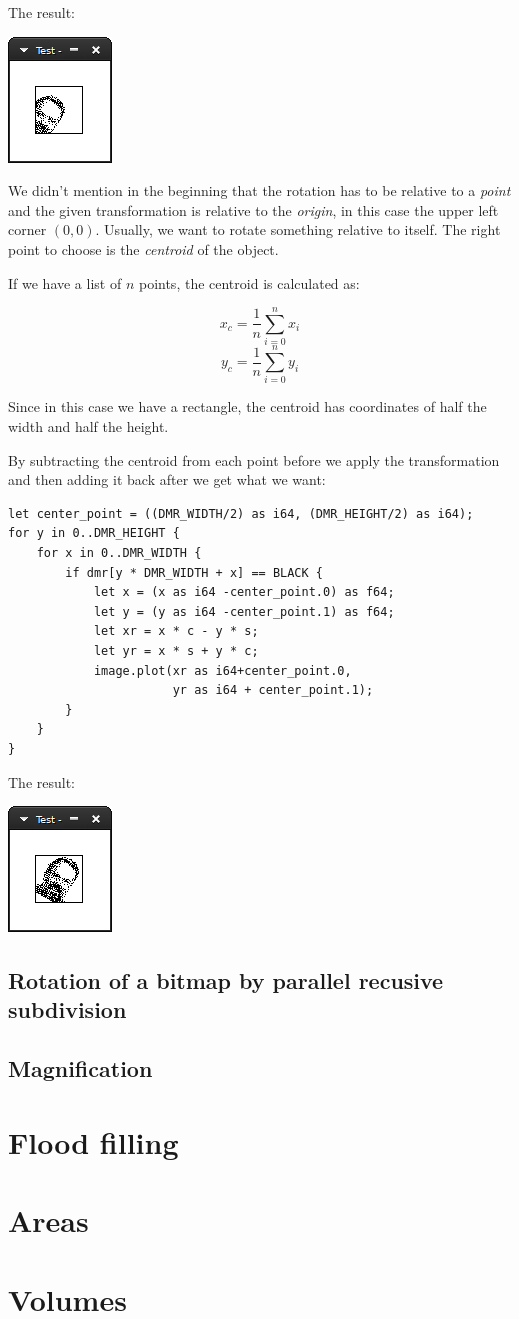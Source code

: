 \documentclass[12pt,a4,oneside,usenames,dvipsnames]{book}
\newcommand\bitmap{{\pixel{}bitmap}}
\begin{document}
The result:

\includegraphics{figures/ch11-2.png}

We didn't mention in the beginning that the rotation has to be relative to a \emph{point} and the given transformation is relative to the \emph{origin}, in this case the upper left corner $(0,0)$. Usually, we want to rotate something relative to itself. The right point to choose is the \emph{centroid} of the object.

If we have a list of $n$ points, the centroid is calculated as:

$$ x_c = \frac{1}{n}\sum_{i=0}^{n} x_i $$
$$ y_c = \frac{1}{n}\sum_{i=0}^{n} y_i $$

Since in this case we have a rectangle, the centroid has coordinates of half the width and half the height.

By subtracting the centroid from each point before we apply the transformation and then adding it back after we get what we want:

\begin{verbatim}
let center_point = ((DMR_WIDTH/2) as i64, (DMR_HEIGHT/2) as i64);
for y in 0..DMR_HEIGHT {
    for x in 0..DMR_WIDTH {
        if dmr[y * DMR_WIDTH + x] == BLACK {
            let x = (x as i64 -center_point.0) as f64;
            let y = (y as i64 -center_point.1) as f64;
            let xr = x * c - y * s;
            let yr = x * s + y * c;
            image.plot(xr as i64+center_point.0,
                       yr as i64 + center_point.1);
        }
    }
}
\end{verbatim}

The result:

\includegraphics{figures/ch11-3.png}

\chapter{Rotation of a \bitmap{} by parallel recusive subdivision}
\chapter{Magnification}
\part{Flood filling}
\part{Areas}
\part{Volumes}
\end{document}
